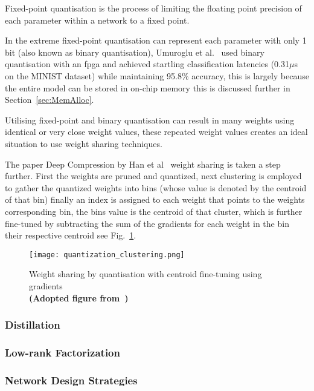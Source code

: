 \documentclass[../../D1.tex]{subfiles}
\begin{document}
Fixed-point quantisation is the process of limiting the floating point precision of each parameter within a network to a fixed point. 

In the extreme fixed-point quantisation can represent each parameter with only 1 bit (also known as binary quantisation), Umuroglu et al.~\autocite{umurogluFINNFrameworkFast2017} used binary quantisation with an \acrshort{fpga} and achieved startling classification latencies (0.31$\mu$s on the MINIST dataset) while maintaining 95.8\% accuracy, this is largely because the entire model can be stored in on-chip memory this is discussed further in Section~\ref{sec:MemAlloc}.


Utilising fixed-point and binary quantisation can result in many weights using identical or very close weight values, these repeated weight values creates an ideal situation to use weight sharing techniques.

The paper Deep Compression by Han et al~\autocite{hanDeepCompressionCompressing2016} weight sharing is taken a step further.
First the weights are pruned and quantized, next clustering is employed to gather the quantized weights into bins (whose value is denoted by the centroid of that bin) finally an index is assigned to each weight that points to the weights corresponding bin, the bins value is the centroid of that cluster, which is further fine-tuned by subtracting the sum of the gradients for each weight in the bin their respective centroid see Fig.~\ref{fig:QuantisationClust}.  

\begin{figure}[H]
    \begin{center}
        \texttt{[image: quantization\_clustering.png]} 
    \end{center}
    
    \caption{Weight sharing by quantisation with centroid fine-tuning using gradients\\ \textbf{(Adopted figure from~\autocite{hanDeepCompressionCompressing2016})}}
    \label{fig:QuantisationClust}   
\end{figure}



\subsubsection{Distillation}\label{sec:Distillation}



\subsubsection{Low-rank Factorization}\label{sec:lrFactorization}

\subsubsection{Network Design Strategies}\label{sec:NetworkDesignStrat}
\end{document}
